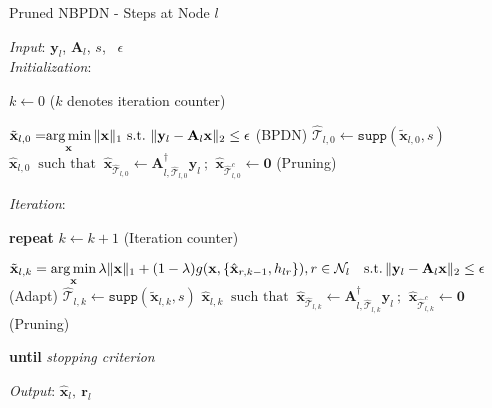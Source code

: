\documentclass[journal]{IEEEtran}
\newcommand{\mbx}{\mathbf{x}}
\newcommand{\mbA}{\mathbf{A}}
\newcommand{\mby}{\mathbf{y}}
\newcommand{\T}{\mathcal{T}}
\newcommand{\supp}{\ensuremath{\texttt{supp}}}
\DeclareMathOperator*{\argmin}{arg\,min}
\newcommand*{\argminl}{\argmin\limits}
\begin{document}
\begin{algorithm}
\caption{Pruned NBPDN - Steps at Node $l$} \label{algo:greedy_s_prune_BPDN}
\emph{Input}: $\mathbf{y}_l$, $\mathbf{A}_l$, $s$, \ $\epsilon$ \\
\emph{Initialization}:
\begin{algorithmic}
\State $k \gets 0$ \hfill ($k$ denotes iteration counter)
\end{algorithmic}
\begin{algorithmic}[1]
\State $\tilde{\mathbf{x}}_{l,0} = \hspace{-1mm} \argminl\limits_{\mathbf{x}} \|\mathbf{x}\|_{1} \,\, \text{s.t.} \,\, \|\mathbf{y}_l - \mathbf{A}_l \mathbf{x}\|_{2} \leq \epsilon $  \hfill (BPDN)
\State $\hat{\T}_{l,0} \gets \supp (\tilde{\mbx}_{l,0},s)$
\State $\hat{\mbx}_{l,0} \,\,\ \text{such that} \,\,\ \hat{\mbx}_{\hat{\T}_{l,0}} \gets \mbA^{\dag}_{l,\hat{\T}_{l,0}} \mby_l \ ; \,\ \hat{\mbx}_{\hat{\T}^{c}_{l,0}} \gets \mathbf{0}$ \hfill (Pruning)
\end{algorithmic}
\emph{Iteration}:
\begin{algorithmic}
\State \textbf{repeat}
\State $k \gets k+1$ \hfill (Iteration counter)
\end{algorithmic}
\begin{algorithmic}[1]
\State $\tilde{\mbx}_{l,k}  =  \argminl\limits_{\mbx}  \lambda \|\mathbf{x}\|_{1}+(1-\lambda)g(\mbx,\{\hat{\mbx}_{r,k-1}, h_{lr}\}), r \in \mathcal{N}_l  \,\,\,\,\ \text{s.t.} \, \|\mathbf{y}_l - \mathbf{A}_l \mathbf{x}\|_{2} \leq \epsilon$ \hfill (Adapt)
\State $\hat{\T}_{l,k} \gets \supp (\tilde{\mbx}_{l,k},s)$
\State $\hat{\mbx}_{l,k} \,\,\ \text{such that} \,\,\ \hat{\mbx}_{\hat{\T}_{l,k}} \gets \mbA^{\dag}_{l,\hat{\T}_{l,k}} \mby_l \ ; \,\ \hat{\mbx}_{\hat{\T}^{c}_{l,k}} \gets \mathbf{0}$ \hfill (Pruning)
\end{algorithmic}
\begin{algorithmic}
\State \textbf{until} \emph{stopping criterion}
\end{algorithmic}
\emph{Output}: $\hat{\mathbf{x}}_{l}, \ \mathbf{r}_{l}$
\end{algorithm}
\end{document}
